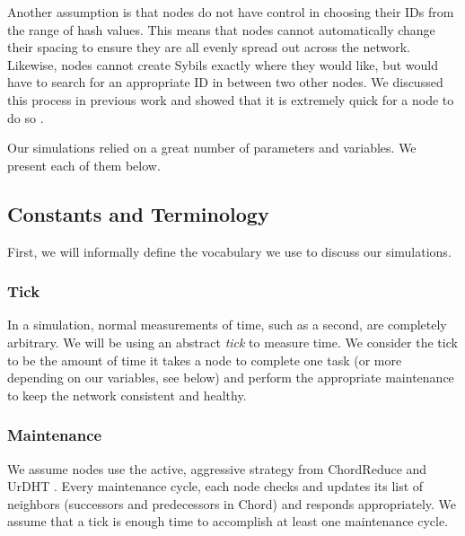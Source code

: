\documentclass[11pt,conference]{IEEEtran}
\begin{document}
Another assumption is that nodes do not have control in choosing their IDs from the range of hash values.
This means that nodes cannot automatically change their spacing to ensure they are all evenly spread out across the network.
Likewise, nodes cannot create Sybils exactly where they would like, but would have to search for an appropriate ID in between two other nodes.
We discussed this process in previous work and showed that it is extremely quick for a node to do so \cite{sybil-analysis}.





%
%
%

Our simulations relied on a great number of parameters and variables.
We present each of them below.

\subsection{Constants and Terminology}

First, we will informally define the vocabulary we use to discuss our simulations.

\subsubsection*{Tick} In a simulation, normal measurements of time, such as a second, are completely arbitrary.  
We will be using an abstract \textit{tick} to measure time.  
We consider the tick to be the amount of time it takes a node to complete one task (or more depending on our variables, see below) and perform the appropriate maintenance to keep the network consistent and healthy.

\subsubsection*{Maintenance} We assume nodes use the active, aggressive strategy from ChordReduce and UrDHT \cite{chordreduce} \cite{urdht}.
Every maintenance cycle, each node checks and updates its list of neighbors (successors and predecessors in Chord) and responds appropriately. 
We assume that a tick is enough time to accomplish at least one maintenance cycle.
\end{document}
